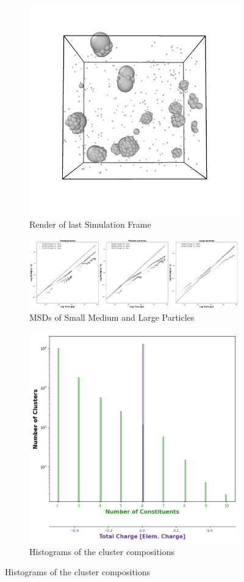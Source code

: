 \documentclass[draft, english]{volcanica-template}
\begin{document}
\begin{figure}[!htbp]
\centering
\begin{figure}[!htbp]
\centering
\includegraphics[width=0.7\linewidth]{files/LastRender-638710b202e2a9f0de90f381a107679c.png}
\caption[]{Render of last Simulation Frame}
\label{Fig7_NoQTestSys}
\end{figure}

\begin{figure}[!htbp]
\centering
\includegraphics[width=0.7\linewidth]{files/Combined_MSD-36bf99db09a32befc410814bc5eb3007.png}
\caption[]{MSDs of Small Medium and Large Particles}
\label{Fig7_NoQTestSys-b}
\end{figure}

\begin{figure}[!htbp]
\centering
\includegraphics[width=0.7\linewidth]{files/Cluster_Histogram_Fi-7a86040d5f714d5b35f145066d53a59d.png}
\caption[]{Histograms of the cluster compositions}
\label{Fig7_NoQTestSys-c}
\end{figure}


\end{figure}
\end{document}
